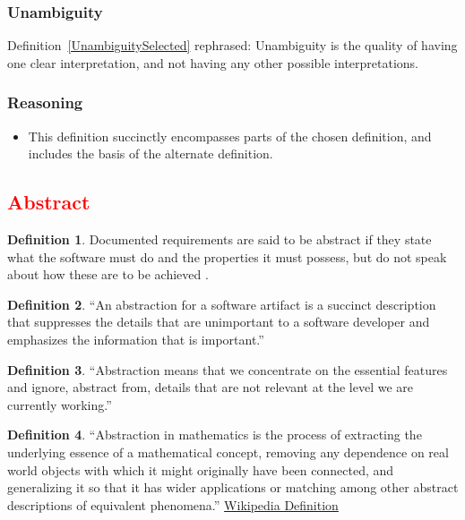 \documentclass[letterpaper, cleveref]{lipics-v2019}
\newcommand{\authornote}[3]{\textcolor{#1}{[#3 ---#2]}}
\newcommand{\authornote}[3]{}
\newcommand{\wss}[1]{\authornote{blue}{SS}{#1}} %
\newcommand{\notdone}[1]{\textcolor{red}{#1}}
\theoremstyle{definition}
\newtheorem{defn}{Definition}
\begin{document}
\begin{mybox}
\subsubsection*{Unambiguity} 
Definition~\ref{UnambiguitySelected} rephrased: Unambiguity is the quality of having one clear interpretation, and not having any other possible interpretations.
\end{mybox}

\subsubsection*{Reasoning}

\begin{itemize}
  \item This definition succinctly encompasses parts of the chosen definition, and includes the basis of the alternate definition.
\end{itemize}


\subsection{\notdone{Abstract}} %

\begin{defn}
  Documented requirements are said to be abstract if they state what the
  software must do and the properties it must possess, but do not speak about
  how these are to be achieved \citep{GhezziEtAl2003}.
\end{defn}

\begin{defn}
  ``An abstraction for a software artifact is a succinct description that
  suppresses the details that are unimportant to a software developer and
  emphasizes the information that is important.'' \citep{Krueger1992}
\end{defn}

\begin{defn}
  ``Abstraction means that we concentrate on the essential features and ignore,
  abstract from, details that are not relevant at the level we are currently
  working.''  \citep[p.\ 296]{VanVliet2000}
\end{defn}

\begin{defn}
  ``Abstraction in mathematics is the process of extracting the underlying
  essence of a mathematical concept, removing any dependence on real world
  objects with which it might originally have been connected, and generalizing
  it so that it has wider applications or matching among other abstract
  descriptions of equivalent phenomena.''
  \href{https://en.wikipedia.org/wiki/Abstraction_(mathematics)} {Wikipedia
    Definition}
\end{defn}
\end{document}
